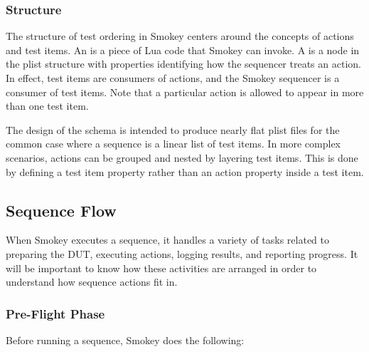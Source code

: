 \subsubsection{Structure}

The structure of test ordering in Smokey centers around the concepts of actions
and test items.  An  is a piece of Lua code that Smokey can
invoke.  A  is a node in the plist structure with properties
identifying how the sequencer treats an action.  In effect, test items are
consumers of actions, and the Smokey sequencer is a consumer of test items.
Note that a particular action is allowed to appear in more than one test item.

The design of the schema is intended to produce nearly flat plist files for the
common case where a sequence is a linear list of test items.  In more complex
scenarios, actions can be grouped and nested by layering test items.  This is
done by defining a test item property rather than an action property inside a
test item.

\subsection{Sequence Flow}
\label{sec:SeqFlow}

When Smokey executes a sequence, it handles a variety of tasks related to
preparing the DUT, executing actions, logging results, and reporting progress.
It will be important to know how these activities are arranged in order to
understand how sequence actions fit in.

\subsubsection{Pre-Flight Phase}

Before running a sequence, Smokey does the following:

